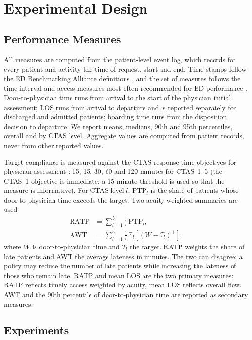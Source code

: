 \section{Experimental Design}
\label{sec:design}

\subsection{Performance Measures}

All measures are computed from the patient-level event log, which records for every patient and activity the time of request, start and end. Time stamps follow the ED Benchmarking Alliance definitions \cite{ED-Metrics_WELCH2013}, and the set of measures follows the time-interval and access measures most often recommended for ED performance \cite{Sorup2013_EDPerformance}. Door-to-physician time runs from arrival to the start of the physician initial assessment; LOS runs from arrival to departure and is reported separately for discharged and admitted patients; boarding time runs from the disposition decision to departure. We report means, medians, 90th and 95th percentiles, overall and by CTAS level. Aggregate values are computed from patient records, never from other reported values.

Target compliance is measured against the CTAS response-time objectives for physician assessment \cite{Bullard2017_CTAS}: 15, 15, 30, 60 and 120 minutes for CTAS~1--5 (the CTAS~1 objective is immediate; a 15-minute threshold is used so that the measure is informative). For CTAS level $l$, $\text{PTP}_l$ is the share of patients whose door-to-physician time exceeds the target. Two acuity-weighted summaries are used:
\begin{align}
\text{RATP} &= \sum_{l=1}^{5}\frac{1}{l}\,\text{PTP}_l, \\
\text{AWT} &= \sum_{l=1}^{5}\frac{1}{l}\,\mathbb{E}_l\!\left[(W-T_l)^+\right],
\end{align}
where $W$ is door-to-physician time and $T_l$ the target. RATP weights the share of late patients and AWT the average lateness in minutes. The two can disagree: a policy may reduce the number of late patients while increasing the lateness of those who remain late. RATP and mean LOS are the two primary measures: RATP reflects timely access weighted by acuity, mean LOS reflects overall flow. AWT and the 90th percentile of door-to-physician time are reported as secondary measures.

\subsection{Experiments}

